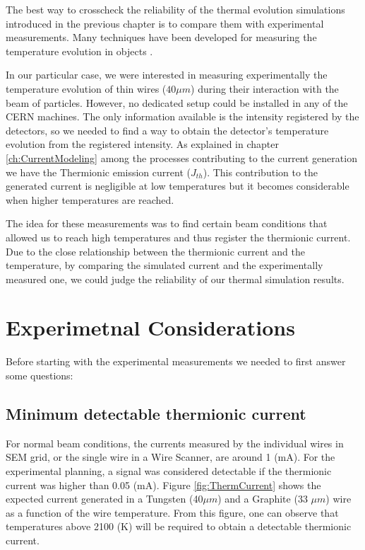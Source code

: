 \pagestyle{fancy}

\graphicspath{ {Figures/Chapter6_SimulationBenchmarking/} }

The best way to crosscheck the reliability of the thermal evolution simulations introduced in the previous chapter is to compare them with experimental measurements. Many techniques have been developed for measuring the temperature evolution in objects \parencite[][]{ref:ThMeas1}. 

In our particular case, we were interested in measuring experimentally the temperature evolution of thin wires ($40 \mu m$) during their interaction with the beam of particles. However, no dedicated setup could be installed in any of the CERN machines. The only information available is the intensity registered by the detectors, so we needed to find a way to obtain the detector's temperature evolution from the registered intensity.  As explained in chapter \ref{ch:CurrentModeling} among the processes contributing to the current generation we have the Thermionic emission current ($J_{th}$). This contribution to the generated current is negligible at low temperatures but it becomes considerable when higher temperatures are reached. 

The idea for these measurements was to find certain beam conditions that allowed us to reach high temperatures and thus register the thermionic current. Due to the close relationship between the thermionic current and the temperature, by comparing the simulated current and the experimentally measured one, we could judge the reliability of our thermal simulation results. 

\section{Experimetnal Considerations}

Before starting with the experimental measurements we needed to first answer some questions: 

\subsection{Minimum detectable thermionic current}

For normal beam conditions, the currents measured by the individual wires in SEM grid, or the single wire in a Wire Scanner, are around 1 (mA). For the experimental planning, a signal was considered detectable if the thermionic current was higher than 0.05 (mA). Figure \ref{fig:ThermCurrent} shows the expected current generated in a Tungsten (40$\mu m$) and a Graphite (33 $\mu m$) wire as a function of the wire temperature. From this figure, one can observe that temperatures above 2100 (K) will be required to obtain a detectable thermionic current.  

